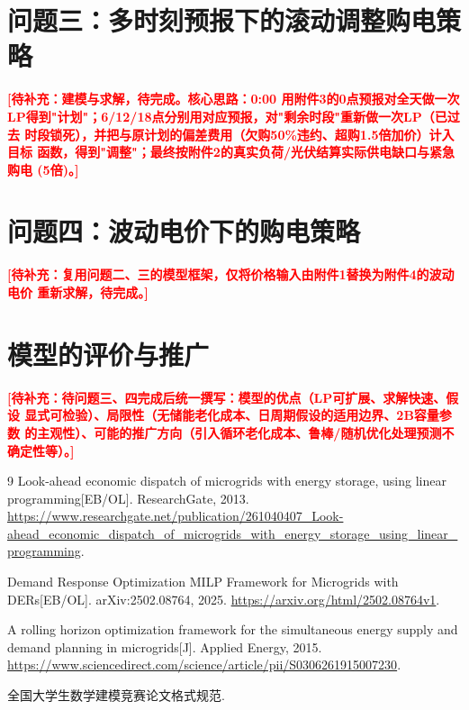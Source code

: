 \documentclass[withoutpreface,bwprint]{cumcmthesis}
\newcommand{\TODO}[1]{\textcolor{red}{\textbf{[待补充：#1]}}}
\begin{document}
\section{问题三：多时刻预报下的滚动调整购电策略}
\TODO{建模与求解，待完成。核心思路：0:00 用附件3的0点预报对全天做一次
LP得到"计划"；6/12/18点分别用对应预报，对"剩余时段"重新做一次LP（已过去
时段锁死），并把与原计划的偏差费用（欠购50\%违约、超购1.5倍加价）计入目标
函数，得到"调整"；最终按附件2的真实负荷/光伏结算实际供电缺口与紧急购电
(5倍)。}

\section{问题四：波动电价下的购电策略}
\TODO{复用问题二、三的模型框架，仅将价格输入由附件1替换为附件4的波动电价
重新求解，待完成。}

\section{模型的评价与推广}
\TODO{待问题三、四完成后统一撰写：模型的优点（LP可扩展、求解快速、假设
显式可检验）、局限性（无储能老化成本、日周期假设的适用边界、2B容量参数
的主观性）、可能的推广方向（引入循环老化成本、鲁棒/随机优化处理预测不确定性等）。}

\begin{thebibliography}{9}
Look-ahead economic dispatch of microgrids with energy storage, using
linear programming[EB/OL]. ResearchGate, 2013.
\url{https://www.researchgate.net/publication/261040407_Look-ahead_economic_dispatch_of_microgrids_with_energy_storage_using_linear_programming}.

Demand Response Optimization MILP Framework for Microgrids with
DERs[EB/OL]. arXiv:2502.08764, 2025. \url{https://arxiv.org/html/2502.08764v1}.

A rolling horizon optimization framework for the simultaneous energy
supply and demand planning in microgrids[J]. Applied Energy, 2015.
\url{https://www.sciencedirect.com/science/article/pii/S0306261915007230}.

全国大学生数学建模竞赛论文格式规范.
\end{thebibliography}

\end{document}
